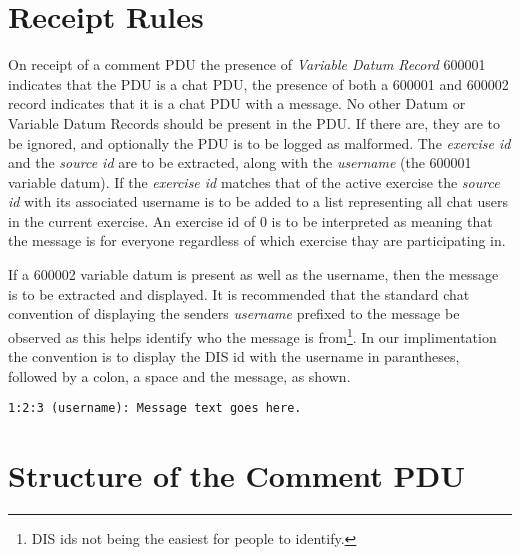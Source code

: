 \documentclass[12pt]{article}
\begin{document}
\section{Receipt Rules}
\label{sec:receipt-rules}

On receipt of a comment PDU the presence of \emph{Variable Datum
  Record} 600001 indicates that the PDU is a chat PDU, the presence of
both a 600001 and 600002 record indicates that it is a chat PDU with a
message.  No other Datum or Variable Datum Records should be present in
the PDU. If there are, they are to be ignored, and optionally the PDU
is to be logged as malformed. The \emph{exercise id} and the \emph{source id} are to
be extracted, along with the \emph{username} (the 600001 variable datum). If
the \emph{exercise id} matches that of the active exercise the \emph{source id} with
its associated username is to be added to a list representing all chat
users in the current exercise.  An exercise id of 0 is to be
interpreted as meaning that the message is for everyone regardless of
which exercise thay are participating in.



If a 600002 variable datum is present as well as the username, then
the message is to be extracted and displayed. It is recommended that
the standard chat convention of displaying the senders \emph{username}
prefixed to the message be observed as this helps identify who the
message is from\footnote{DIS ids not being the easiest for people to
  identify.}. In our implimentation the convention is to display the
DIS id with the username in parantheses, followed by a colon, a space
and the message, as shown.
\begin{verbatim}
1:2:3 (username): Message text goes here.
\end{verbatim}

\appendix

\section{Structure of the Comment PDU}
\end{document}
